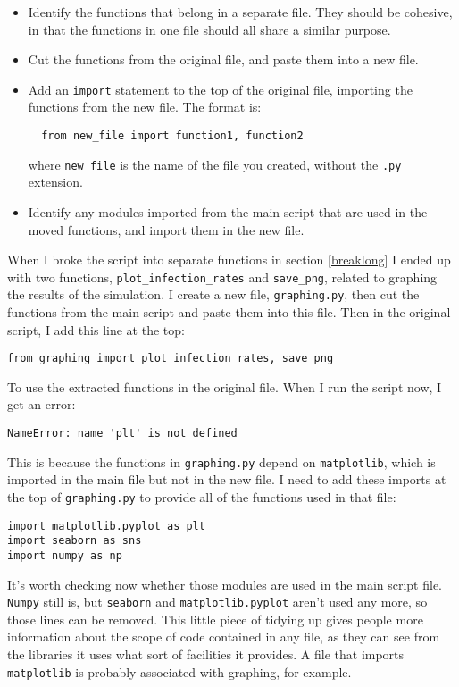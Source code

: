 \documentclass[a4paper]{article}
\begin{document}
\begin{itemize}
\item Identify the functions that belong in a separate file. They should be cohesive, in that the functions in one file should all share a similar purpose.
\item Cut the functions from the original file, and paste them into a new file.
\item Add an \texttt{import} statement to the top of the original file, importing the functions from the new file. The format is:
\begin{verbatim}
  from new_file import function1, function2
\end{verbatim}
where \texttt{new\_file} is the name of the file you created, without the \texttt{.py} extension.
\item Identify any modules imported from the main script that are used in the moved functions, and import them in the new file.
\end{itemize}

When I broke the script into separate functions in section \ref{breaklong} I ended up with two functions, \texttt{plot\_infection\_rates} and \texttt{save\_png}, related to graphing the results of the simulation. I create a new file, \texttt{graphing.py}, then cut the functions from the main script and paste them into this file. Then in the original script, I add this line at the top:

\begin{verbatim}
from graphing import plot_infection_rates, save_png
\end{verbatim}

To use the extracted functions in the original file. When I run the script now, I get an error:

\begin{verbatim}
NameError: name 'plt' is not defined
\end{verbatim}

This is because the functions in \texttt{graphing.py} depend on \texttt{matplotlib}, which is imported in the main file but not in the new file. I need to add these imports at the top of \texttt{graphing.py} to provide all of the functions used in that file:

\begin{verbatim}
import matplotlib.pyplot as plt
import seaborn as sns
import numpy as np
\end{verbatim}

It's worth checking now whether those modules are used in the main script file. \texttt{Numpy} still is, but \texttt{seaborn} and \texttt{matplotlib.pyplot} aren't used any more, so those lines can be removed. This little piece of tidying up gives people more information about the scope of code contained in any file, as they can see from the libraries it uses what sort of facilities it provides. A file that imports \texttt{matplotlib} is probably associated with graphing, for example.
\end{document}
